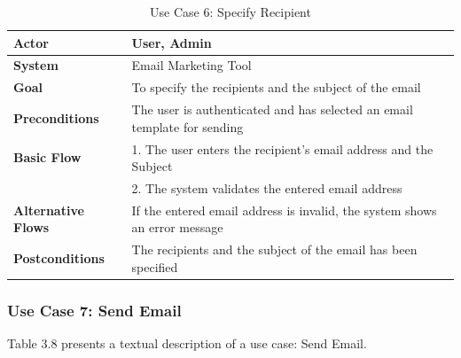 \begin{table}[ht]
	\centering
	\begin{tabularx}{\textwidth}{|l|X|}
		\hline
		\textbf{Actor}             & User, Admin                                                                \\
		\hline
		\textbf{System}            & Email Marketing Tool                                                       \\
		\hline
		\textbf{Goal}              & To specify the recipients and the subject of the email                                     \\
		\hline
		\textbf{Preconditions}     & The user is authenticated and has selected an email template for sending   \\
		\hline
		\textbf{Basic Flow}        & 1. The user enters the recipient's email address and the Subject                           \\
		                           & 2. The system validates the entered email address                          \\
		\hline
		\textbf{Alternative Flows} & If the entered email address is invalid, the system shows an error message \\
		\hline
		\textbf{Postconditions}    & The recipients and the subject of the email has been specified                              \\
		\hline
	\end{tabularx}
	\caption{Use Case 6: Specify Recipient}
	\label{tab:Use Case 6 Specify Recipient}
\end{table}

\clearpage

\subsubsection{Use Case 7: Send Email}

Table 3.8 presents a textual description of a use case: Send Email.

